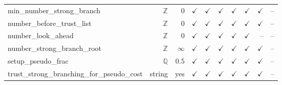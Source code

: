 {\begin{xtabular}{@{}|l|@{\;}r@{\;}|@{\;}r@{\;}|@{\;}r@{\;}|@{\;}r@{\;}|@{\;}r@{\;}|@{\;}r@{\;}|@{\;}r@{\;}|@{\;}r@{\;}|@{\;}r@{\;}|@{}}
min\_number\_strong\_branch & $\mathbb{Z}$ & $0$ & $\checkmark$& $\checkmark$& $\checkmark$& $\checkmark$& $\checkmark$& $\checkmark$& --\\
number\_before\_trust\_list & $\mathbb{Z}$ & $0$ & $\checkmark$& $\checkmark$& $\checkmark$& $\checkmark$& $\checkmark$& $\checkmark$& --\\
number\_look\_ahead & $\mathbb{Z}$ & $0$ & $\checkmark$& $\checkmark$& $\checkmark$& $\checkmark$& $\checkmark$& --& --\\
number\_strong\_branch\_root & $\mathbb{Z}$ & $\infty$ & $\checkmark$& $\checkmark$& $\checkmark$& $\checkmark$& $\checkmark$& $\checkmark$& --\\
setup\_pseudo\_frac & $\mathbb{Q}$ & $0.5$ & $\checkmark$& $\checkmark$& $\checkmark$& $\checkmark$& $\checkmark$& $\checkmark$& --\\
trust\_strong\_branching\_for\_pseudo\_cost & string & yes & $\checkmark$& $\checkmark$& $\checkmark$& $\checkmark$& $\checkmark$& $\checkmark$& --\\
\hline
\end{xtabular}
}
